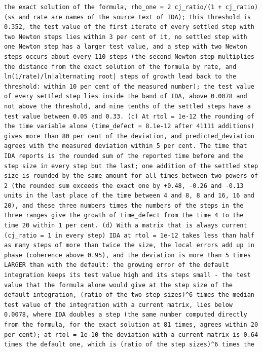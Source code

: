 \documentclass[
  10pt,
]{article}
\begin{document}
\begin{verbatim}
the exact solution of the formula, rho_one = 2 cj_ratio/(1 + cj_ratio) (ss and rate are names of the source text of IDA); this threshold is 0.352, the test value of the first iterate of every settled step with two Newton steps lies within 3 per cent of it, no settled step with one Newton step has a larger test value, and a step with two Newton steps occurs about every 110 steps (the second Newton step multiplies the distance from the exact solution of the formula by rate, and ln(1/rate)/ln|alternating root| steps of growth lead back to the threshold: within 10 per cent of the measured number); the test value of every settled step lies inside the band of IDA, above 0.0078 and not above the threshold, and nine tenths of the settled steps have a test value between 0.05 and 0.33. (c) At rtol = 1e-12 the rounding of the time variable alone (time_defect = 8.1e-12 after 41111 additions) gives more than 80 per cent of the deviation, and predicted_deviation agrees with the measured deviation within 5 per cent. The time that IDA reports is the rounded sum of the reported time before and the step size in every step but the last; one addition of the settled step size is rounded by the same amount for all times between two powers of 2 (the rounded sum exceeds the exact one by +0.48, -0.26 and -0.13 units in the last place of the time between 4 and 8, 8 and 16, 16 and 20), and these three numbers times the numbers of the steps in the three ranges give the growth of time_defect from the time 4 to the time 20 within 1 per cent. (d) With a matrix that is always current (cj_ratio = 1 in every step) IDA at rtol = 1e-12 takes less than half as many steps of more than twice the size, the local errors add up in phase (coherence above 0.95), and the deviation is more than 5 times LARGER than with the default: the growing error of the default integration keeps its test value high and its steps small - the test value that the formula alone would give at the step size of the default integration, (ratio of the two step sizes)^6 times the median test value of the integration with a current matrix, lies below 0.0078, where IDA doubles a step (the same number computed directly from the formula, for the exact solution at 81 times, agrees within 20 per cent); at rtol = 1e-10 the deviation with a current matrix is 0.64 times the default one, which is (ratio of the step sizes)^6 times the

\end{verbatim}
\end{document}
